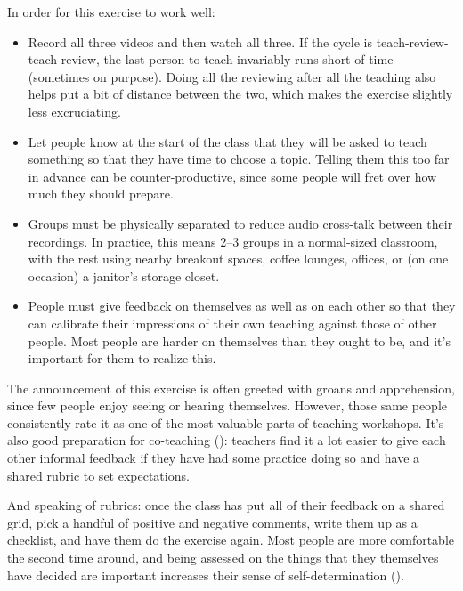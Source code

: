 In order for this exercise to work well:

\begin{itemize}

\item
  Record all three videos and then watch all three.
  If the cycle is teach-review-teach-review,
  the last person to teach invariably runs short of time
  (sometimes on purpose).
  Doing all the reviewing after all the teaching
  also helps put a bit of distance between the two,
  which makes the exercise slightly less excruciating.

\item
  Let people know at the start of the class that they will be asked to teach something
  so that they have time to choose a topic.
  Telling them this too far in advance can be counter-productive,
  since some people will fret over how much they should prepare.

\item
  Groups must be physically separated to reduce audio cross-talk between their recordings.
  In practice,
  this means 2--3 groups in a normal-sized classroom,
  with the rest using nearby breakout spaces, coffee lounges, offices,
  or (on one occasion) a janitor's storage closet.

\item
  People must give feedback on themselves as well as on each other
  so that they can calibrate their impressions of their own teaching
  against those of other people.
  Most people are harder on themselves than they ought to be,
  and it's important for them to realize this.

\end{itemize}

The announcement of this exercise is often greeted with groans and apprehension,
since few people enjoy seeing or hearing themselves.
However,
those same people consistently rate it as one of the most valuable parts of teaching workshops.
It's also good preparation for co-teaching ():
teachers find it a lot easier to give each other informal feedback
if they have had some practice doing so
and have a shared rubric to set expectations.

And speaking of rubrics:
once the class has put all of their feedback on a shared grid,
pick a handful of positive and negative comments,
write them up as a checklist,
and have them do the exercise again.
Most people are more comfortable the second time around,
and being assessed on the things that they themselves have decided are important
increases their sense of self-determination ().

